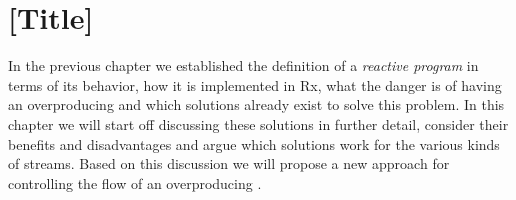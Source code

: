 \chapter{[Title]}
In the previous chapter we established the definition of a \textit{reactive program} in terms of its behavior, how it is implemented in Rx, what the danger is of having an overproducing \obs and which solutions already exist to solve this problem. In this chapter we will start off discussing these solutions in further detail, consider their benefits and disadvantages and argue which solutions work for the various kinds of streams. Based on this discussion we will propose a new approach for controlling the flow of an overproducing \obs.





